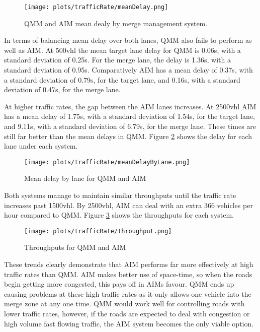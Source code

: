 \begin{figure}[htb]
\texttt{[image: plots/trafficRate/meanDelay.png]}
\caption{QMM and AIM mean dealy by merge management system.}
\label{fig:meanDelayTrafficRate}
\end{figure}

In terms of balancing mean delay over both lanes, QMM also fails to perform as well as AIM. At 500\si{vhl} the mean target lane delay for QMM is 0.06\si{s}, with a standard deviation of 0.25\si{s}. For the merge lane, the delay is 1.36\si{s}, with a standard deviation of 0.95\si{s}. Comparatively AIM has a mean delay of 0.37\si{s}, with a standard deviation of 0.79\si{s}, for the target lane, and 0.16\si{s}, with a standard deviation of 0.47\si{s}, for the merge lane.

At higher traffic rates, the gap between the AIM lanes increases. At 2500\si{vhl} AIM has a mean delay of 1.75\si{s}, with a standard deviation of 1.54\si{s}, for the target lane, and 9.11\si{s}, with a standard deviation of 6.79\si{s}, for the merge lane. These times are still far better than the mean delays in QMM. Figure \ref{fig:meanDelayByLaneTrafficRate} shows the delay for each lane under each system.

\begin{figure}[htb]
\centerline{
\texttt{[image: plots/trafficRate/meanDelayByLane.png]}
}
\caption{Mean delay by lane for QMM and AIM}
\label{fig:meanDelayByLaneTrafficRate}
\end{figure}

Both systems manage to maintain similar throughputs until the traffic rate increases past 1500\si{vhl}. By 2500\si{vhl}, AIM can deal with an extra 366 vehicles per hour compared to QMM. Figure \ref{fig:throughputTrafficRate} shows the throughputs for each system.

\begin{figure}[htb]
\centering
\texttt{[image: plots/trafficRate/throughput.png]}
\caption{Throughputs for QMM and AIM}
\label{fig:throughputTrafficRate}
\end{figure}

These trends clearly demonstrate that AIM performs far more effectively at high traffic rates than QMM. AIM makes better use of space-time, so when the roads begin getting more congested, this pays off in AIMs favour. QMM ends up causing problems at these high traffic rates as it only allows one vehicle into the merge zone at any one time. QMM would work well for controlling roads with lower traffic rates, however, if the roads are expected to deal with congestion or high volume fast flowing traffic, the AIM system becomes the only viable option.

